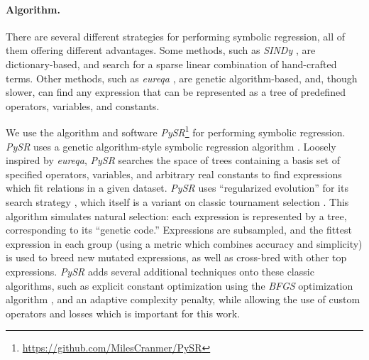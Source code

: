 \documentclass[nohyperref]{article}
\newcommand\pysr{\textit{PySR}\xspace}
\theoremstyle{plain}
\theoremstyle{definition}
\theoremstyle{remark}
\begin{document}
\paragraph{Algorithm.}
There are several different strategies for performing symbolic regression, all of them offering different advantages.
Some methods, such as \textit{SINDy} \cite{bruntonDiscoveringGoverningEquations2016}, are dictionary-based, and search for a sparse linear combination of hand-crafted terms.
Other methods, such as \textit{eureqa} \cite{schmidtDistillingFreeFormNatural2009}, are genetic algorithm-based, and, though slower, can find any expression that can be represented as a tree of predefined operators, variables, and constants.

We use the algorithm and software \pysr\footnote{\url{https://github.com/MilesCranmer/PySR}} \cite{cranmerPySRFastParallelized2020} for performing symbolic regression.
\pysr uses a genetic algorithm-style symbolic regression algorithm
\citep[see][for an early example]{kozaGeneticProgrammingMeans1994}.
Loosely inspired by \textit{eureqa},
\pysr searches the space of trees 
containing a basis set of specified operators, variables, and arbitrary real constants
to find expressions which fit relations in a given dataset.
\pysr uses ``regularized evolution'' for its search strategy 
\cite{realRegularizedEvolutionImage2019,realAutoMLZeroEvolvingMachine2020},
which itself is a variant on classic tournament selection
\cite{brindleGeneticAlgorithmsFunction1980,goldbergComparativeAnalysisSelection1991}.
This algorithm simulates natural selection: each expression is represented by a tree, corresponding to its ``genetic code.''
Expressions are subsampled, and the fittest expression in each group (using a metric which combines accuracy and simplicity) is used to breed new mutated expressions, as well as cross-bred with other top expressions.
\pysr adds several additional techniques onto these classic algorithms, such as explicit constant optimization using the \textit{BFGS} optimization algorithm \cite{fletcherPracticalMethodsOptimization1988}, and an adaptive complexity penalty, while allowing the use of custom operators and losses which is important for this work.
\end{document}
